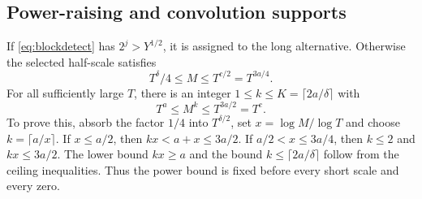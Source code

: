 \documentclass[11pt,a4paper]{article}
\numberwithin{equation}{section}
\theoremstyle{definition}
\begin{document}
\subsection{Power-raising and convolution supports}
If \eqref{eq:blockdetect} has $2^j>Y^{1/2}$, it is assigned to the long
alternative. Otherwise the selected half-scale satisfies
\[
 T^\delta/4\le M\le T^{c/2}=T^{3a/4}.
\]
For all sufficiently large $T$, there is an integer
$1\le k\le K=\lceil2a/\delta\rceil$ with
\begin{equation}\label{eq:powerlength}
 T^a\le M^k\le T^{3a/2}=T^c.
\end{equation}
To prove this, absorb the factor $1/4$ into $T^{\delta/2}$, set
$x=\log M/\log T$ and choose $k=\lceil a/x\rceil$.
If $x\le a/2$, then $kx<a+x\le3a/2$.
If $a/2<x\le3a/4$, then $k\le2$ and $kx\le3a/2$.
The lower bound $kx\ge a$ and the bound
$k\le\lceil2a/\delta\rceil$ follow from the ceiling inequalities.
Thus the power bound is fixed before every short scale and every zero.
\end{document}
